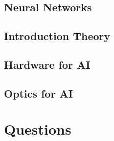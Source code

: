 \documentclass[main.tex]{subfiles}
\begin{document}
\subsection{Neural Networks}
\subsection{Introduction Theory}
\subsection{Hardware for AI}
\subsection{Optics for AI}

\section{Questions}
\end{document}
